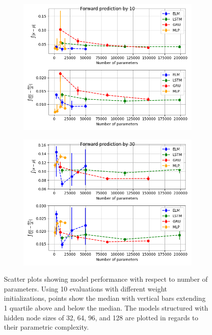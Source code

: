 \documentclass[11pt]{article}
\begin{document}
\begin{figure}
\begin{center}
\begin{subfigure}{.48\textwidth}
        \includegraphics[width=\textwidth]{figures/mg1_scatter_10.png}
      \end{subfigure}
      \begin{subfigure}{.48\textwidth}
        \includegraphics[width=\textwidth]{figures/mg1_scatter_30.png}
      \end{subfigure}
       
    \caption{Scatter plots showing model performance with respect to
      number of parameters. Using 10 evaluations with different weight
    initializations, points show the median with vertical bars
    extending 1 quartile above and below the median. The models structured with hidden node sizes of 32, 64, 96, and 128 are plotted in regards to their parametric complexity.}
    \label{fig:mg1_scatter}
    \end{center}
  \end{figure}
  
\end{document}
